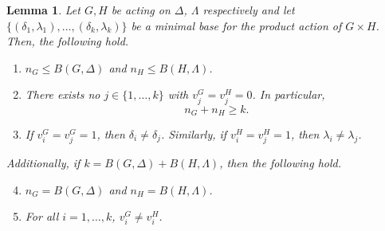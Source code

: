 \documentclass{amsart}
\newtheorem{lemma}[theorem]{Lemma}
\begin{document}
	\begin{lemma}
		\label{lemmaVect}
		Let $G,H$ be acting on $\Delta$, $\Lambda$ respectively and let  $\{(\delta_1,\lambda_1), \dots , (\delta_k, \lambda_k)\}$ be a minimal base for the product action of $G \times H$. Then, the following hold.
		\begin{enumerate}
			\item\label{item1} $n_G \leq B(G,\Delta)$ and $n_H \leq B(H,\Lambda)$.
			\item\label{item2} There exists no $j\in \{1,\ldots,k\}$ with $v_j^G=v_j^H=0$. In particular, $$n_G + n_H \geq k.$$
			\item\label{item3} If $v^G_i = v^G_j = 1$, then $\delta_i \neq \delta_j$. Similarly, if $v^H_i = v^H_j = 1$, then $\lambda_i \neq \lambda_j$.
		\end{enumerate}
		Additionally, if $k=B(G,\Delta)+B(H,\Lambda)$, then the following hold.
		\begin{enumerate}
			 \setcounter{enumi}{3}
			\item\label{item4} $n_G = B(G,\Delta)$ and $n_H = B(H,\Lambda)$.
			
			\item\label{item5} For all $i=1,\dots,k$, $v^G_i \neq v^H_i$.
		\end{enumerate}		
	\end{lemma}
\end{document}
